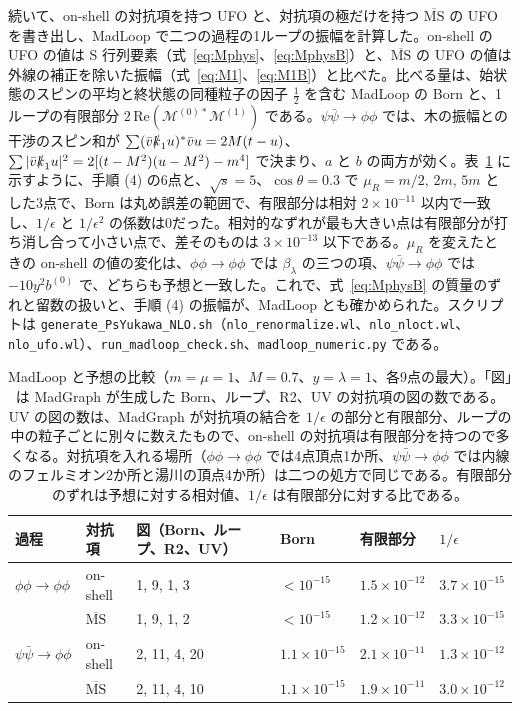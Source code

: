 \documentclass[a4paper,10pt]{ltjsarticle}
\newcommand{\MSbar}{\overline{\mathrm{MS}}}
\begin{document}
続いて、on-shell の対抗項を持つ UFO と、対抗項の極だけを持つ $\MSbar$ の UFO を書き出し、MadLoop で二つの過程の1ループの振幅を計算した。on-shell の UFO の値は S 行列要素（式~\eqref{eq:Mphys}、\eqref{eq:MphysB}）と、$\MSbar$ の UFO の値は外線の補正を除いた振幅（式~\eqref{eq:M1}、\eqref{eq:M1B}）と比べた。比べる量は、始状態のスピンの平均と終状態の同種粒子の因子 $\frac12$ を含む MadLoop の Born と、1ループの有限部分 $2\,\mathrm{Re}(\mathcal M^{(0)*}\mathcal M^{(1)})$ である。$\psi\bar\psi\to\phi\phi$ では、木の振幅との干渉のスピン和が $\sum(\bar v\slashed k_1u)^*\bar vu=2M(t-u)$、$\sum|\bar v\slashed k_1u|^2=2[(t-M^2)(u-M^2)-m^4]$ で決まり、$a$ と $b$ の両方が効く。表~\ref{tab:madloop} に示すように、手順 (4) の6点と、$\sqrt s=5$、$\cos\theta=0.3$ で $\mu_R=m/2,\,2m,\,5m$ とした3点で、Born は丸め誤差の範囲で、有限部分は相対 $2\times10^{-11}$ 以内で一致し、$1/\epsilon$ と $1/\epsilon^2$ の係数は0だった。相対的なずれが最も大きい点は有限部分が打ち消し合って小さい点で、差そのものは $3\times10^{-13}$ 以下である。$\mu_R$ を変えたときの on-shell の値の変化は、$\phi\phi\to\phi\phi$ では $\beta_\lambda$ の三つの項、$\psi\bar\psi\to\phi\phi$ では $-10y^2b^{(0)}$ で、どちらも予想と一致した。これで、式~\eqref{eq:MphysB} の質量のずれと留数の扱いと、手順 (4) の振幅が、MadLoop とも確かめられた。スクリプトは \texttt{generate\_PsYukawa\_NLO.sh}（\texttt{nlo\_renormalize.wl}、\texttt{nlo\_nloct.wl}、\texttt{nlo\_ufo.wl}）、\texttt{run\_madloop\_check.sh}、\texttt{madloop\_numeric.py} である。

\begin{table}[tbp]
\centering\small
\caption{MadLoop と予想の比較（$m=\mu=1$、$M=0.7$、$y=\lambda=1$、各9点の最大）。「図」は MadGraph が生成した Born、ループ、R2、UV の対抗項の図の数である。UV の図の数は、MadGraph が対抗項の結合を $1/\epsilon$ の部分と有限部分、ループの中の粒子ごとに別々に数えたもので、on-shell の対抗項は有限部分を持つので多くなる。対抗項を入れる場所（$\phi\phi\to\phi\phi$ では4点頂点1か所、$\psi\bar\psi\to\phi\phi$ では内線のフェルミオン2か所と湯川の頂点4か所）は二つの処方で同じである。有限部分のずれは予想に対する相対値、$1/\epsilon$ は有限部分に対する比である。}
\label{tab:madloop}
\begin{tabular}{llllll}
\toprule
過程 & 対抗項 & 図（Born、ループ、R2、UV） & Born & 有限部分 & $1/\epsilon$ \\
\midrule
$\phi\phi\to\phi\phi$ & on-shell & 1, 9, 1, 3 & $<10^{-15}$ & $1.5\times10^{-12}$ & $3.7\times10^{-15}$ \\
 & $\MSbar$ & 1, 9, 1, 2 & $<10^{-15}$ & $1.2\times10^{-12}$ & $3.3\times10^{-15}$ \\
$\psi\bar\psi\to\phi\phi$ & on-shell & 2, 11, 4, 20 & $1.1\times10^{-15}$ & $2.1\times10^{-11}$ & $1.3\times10^{-12}$ \\
 & $\MSbar$ & 2, 11, 4, 10 & $1.1\times10^{-15}$ & $1.9\times10^{-11}$ & $3.0\times10^{-12}$ \\
\bottomrule
\end{tabular}
\end{table}
\end{document}
